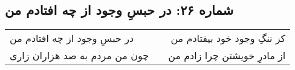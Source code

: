 \begin{center}
\section*{شماره ۲۶: در حبسِ وجود از چه افتادم من}
\label{sec:026}
\begin{longtable}{l p{0.5cm} r}
در حبسِ وجود از چه افتادم من
&&
کز ننگِ وجود خود بیفتادم من
\\
چون من مردم به صد هزاران زاری
&&
از مادرِ خویشتن چرا زادم من
\\
\end{longtable}
\end{center}
